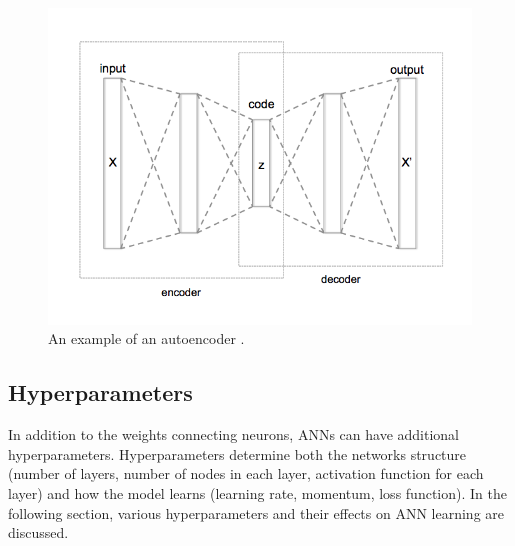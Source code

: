 

\begin{figure}[H]
\centering
\includegraphics[width=0.8\linewidth]{images/Autoencoder_structure}
\caption{An example of an autoencoder \cite{wiki:AutoencoderStructure}.}
\label{fig:Autoencoder_structure}
\end{figure}






\subsection{Hyperparameters}

In addition to the weights connecting neurons, ANNs can have additional hyperparameters. Hyperparameters determine both the networks structure (number of layers, number of nodes in each layer, activation function for each layer) and how the model learns (learning rate, momentum, loss function). In the following section, various hyperparameters and their effects on ANN learning are discussed.

